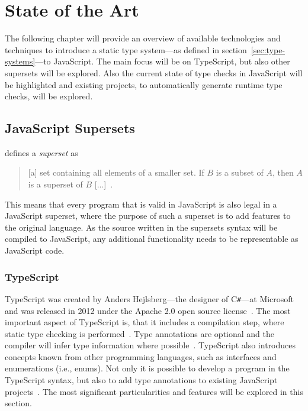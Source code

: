 \chapter{State of the Art}
\label{cha:state-of-the-art}

The following chapter will provide an overview of available technologies and techniques to introduce a static type system---as defined in section~\ref{sec:type-systems}---to JavaScript. The main focus will be on TypeScript, but also other supersets will be explored. Also the current state of type checks in JavaScript will be highlighted and existing projects, to automatically generate runtime type checks, will be explored.

\section{JavaScript Supersets}
\label{sec:supersets}

\citeauthor{Term:Superset} defines a \emph{superset} as 
\begin{quote}
   [a] set containing all elements of a smaller set. If $B$ is a subset of $A$, then $A$ is a superset of $B$ [...]~\cite{Term:Superset}.
\end{quote}
This means that every program that is valid in JavaScript is also legal in a JavaScript superset, where the purpose of such a superset is to add features to the original language. As the source written in the supersets syntax will be compiled to JavaScript, any additional functionality needs to be representable as JavaScript code.

\subsection{TypeScript}
\label{sec:typescript}

TypeScript was created by Anders Hejlsberg---the designer of C\texttt{\#}---at Microsoft~\cite[p.~10]{MasteringTypeScript:Rozentals:2017} and was released in 2012 under the Apache 2.0 open source license~\cite[p.~xix]{ProTypeScript:Fenton:2014}. The most important aspect of TypeScript is, that it includes a compilation step, where static type checking is performed~\cite[p.~11]{MasteringTypeScript:Rozentals:2017}. Type annotations are optional and the compiler will infer type information where possible~\cite[p.~10]{TypeScriptBook:Syed:2017}. TypeScript also introduces concepts known from other programming languages, such as interfaces and enumerations (i.e., enums). Not only it is possible to develop a program in the TypeScript syntax, but also to add type annotations to existing JavaScript projects~\cite[p.~13]{MasteringTypeScript:Rozentals:2017}. The most significant particularities and features will be explored in this section.

